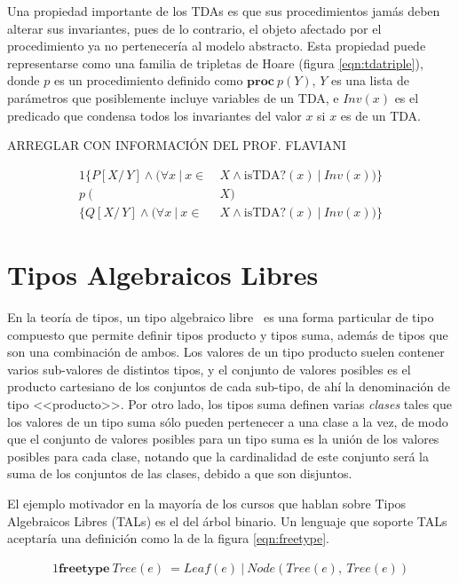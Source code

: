 Una propiedad importante de los TDAs es que sus procedimientos jamás deben
alterar sus invariantes, pues de lo contrario, el objeto afectado por el
procedimiento ya no pertenecería al modelo abstracto. Esta propiedad puede
representarse como una familia de tripletas de Hoare (figura
\ref{eqn:tdatriple}), donde $p$ es un procedimiento definido como
$\textbf{proc}\ p (Y)$, $Y$ es una lista de parámetros que posiblemente incluye
variables de un TDA, e $Inv(x)$ es el predicado que condensa todos los
invariantes del valor $x$ si $x$ es de un TDA.

ARREGLAR CON INFORMACIÓN DEL PROF. FLAVIANI

\begin{alignat}{1}
  \{ P[X/\,Y] \land (\forall x\ |\ x \in\ & X \land \textrm{isTDA?}(x)\ |\ Inv(x) )\} \nonumber \\
  p\ (& X) \label{eqn:tdatriple} \\ 
  \{ Q[X/\,Y] \land (\forall x\ |\ x \in\ & X \land \textrm{isTDA?}(x)\ |\ Inv(x) )\} \nonumber 
\end{alignat}

\section{Tipos Algebraicos Libres}

En la teoría de tipos, un tipo algebraico libre~\cite{ravelotal, foldoc,
lazywithclass} es una forma particular de tipo compuesto que permite definir
tipos producto y tipos suma, además de tipos que son una combinación de ambos.
Los valores de un tipo producto suelen contener varios sub-valores de distintos
tipos, y el conjunto de valores posibles es el producto cartesiano de los
conjuntos de cada sub-tipo, de ahí la denominación de tipo <<producto>>. Por
otro lado, los tipos suma definen varias \textit{clases} tales que  los valores
de un tipo suma sólo pueden pertenecer a una clase a la vez, de modo que el
conjunto de valores posibles para un tipo suma es la unión de los valores
posibles para cada clase, notando que la cardinalidad de este conjunto será la
suma de los conjuntos de las clases, debido a que son disjuntos.

El ejemplo motivador en la mayoría de los cursos que hablan sobre Tipos
Algebraicos Libres (TALs) es el del árbol binario. Un lenguaje que soporte TALs
aceptaría una definición como la de la figura \ref{eqn:freetype}.

\begin{alignat}{1}
\textbf{freetype}\ Tree(e)\ = Leaf(e)\ |\ Node(Tree(e),\ Tree(e)) \label{eqn:freetype}
\end{alignat}


